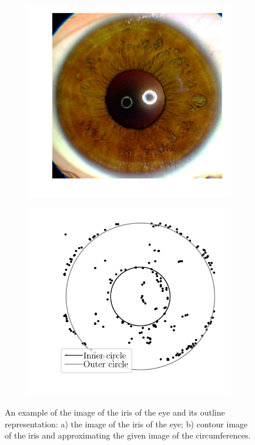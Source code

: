 \documentclass[12pt, twoside]{article}
\numberwithin{equation}{section}
\begin{document}
\begin{figure}[h!]
     \centering
     \begin{subfigure}[b]{0.3\textwidth}
         \centering
         \includegraphics[width=\textwidth]{figures/real_image}
         \caption{}
         \label{intro:fig1:real}
     \end{subfigure}
     \begin{subfigure}[b]{0.3\textwidth}
         \centering
         \includegraphics[width=\textwidth]{figures/outline_image}
         \caption{}
         \label{intro:fig1:outer}
     \end{subfigure}
\caption{An example of the image of the iris of the eye and its outline representation: a) the image of the iris of the eye; b) contour image of the iris and approximating the given image of the circumferences.}    \label{intro:fig1}
\end{figure}
\end{document}
